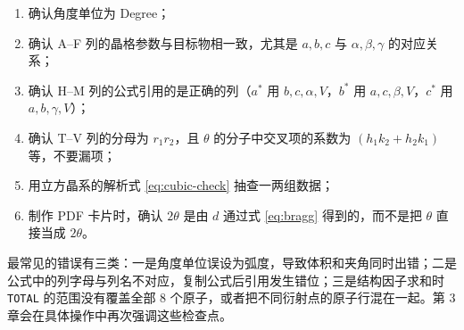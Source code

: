 \begin{enumerate}[label=（\arabic*）,leftmargin=2.2em,itemsep=1pt]
  \item 确认角度单位为 Degree；
  \item 确认 A--F 列的晶格参数与目标物相一致，尤其是 $a,b,c$ 与 $\alpha,\beta,\gamma$ 的对应关系；
  \item 确认 H--M 列的公式引用的是正确的列（$a^*$ 用 $b,c,\alpha,V$，$b^*$ 用 $a,c,\beta,V$，$c^*$ 用 $a,b,\gamma,V$）；
  \item 确认 T--V 列的分母为 $r_1r_2$，且 $\theta$ 的分子中交叉项的系数为 $(h_1k_2+h_2k_1)$ 等，不要漏项；
  \item 用立方晶系的解析式 \eqref{eq:cubic-check} 抽查一两组数据；
  \item 制作 PDF 卡片时，确认 $2\theta$ 是由 $d$ 通过式 \eqref{eq:bragg} 得到的，而不是把 $\theta$ 直接当成 $2\theta$。
\end{enumerate}

最常见的错误有三类：一是角度单位误设为弧度，导致体积和夹角同时出错；二是公式中的列字母与列名不对应，复制公式后引用发生错位；三是结构因子求和时 \texttt{TOTAL} 的范围没有覆盖全部 8 个原子，或者把不同衍射点的原子行混在一起。第 3 章会在具体操作中再次强调这些检查点。
